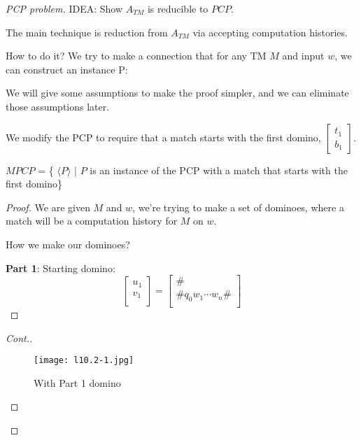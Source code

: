 \begin{proof}[PCP problem]
    IDEA: Show \(A_{TM}\) is reducible to \(PCP\).  

    The main technique is reduction from \(A_{TM}\) via accepting computation histories. 

    How to do it? We try to make a connection that for any TM \(M\) and input \(w\), we can construct an instance P:


    We will give some assumptions to make the proof simpler, and we can eliminate those assumptions later.

    \begin{problem}
        We modify the PCP to require that a match starts with the first domino, \(\begin{bmatrix}
                t_1 \\
                b_1 
        \end{bmatrix} \). 


        \(MPCP\) = \{ \(\langle P \rangle \) | \(P\) is an instance of the PCP with a match that starts with the first domino\} 
    \end{problem}
    \begin{proof}
        We are given \(M\) and \(w\), we're trying to make a set of dominoes, where a match will be a computation history for \(M\) on \(w\).    

        How we make our dominoes?

        \textbf{Part 1}: Starting domino:
        \[
            \begin{bmatrix}
                 u_1 \\
                 v_1 \\
            \end{bmatrix}
            = 
            \begin{bmatrix}
                 \# \\
                 \#q_0w_1\cdots w_n\# \\
            \end{bmatrix}
        \] 
    \end{proof}
    \begin{proof}[Cont.]
        \begin{figure}[H]
            \centering
            \texttt{[image: l10.2-1.jpg]}
            \caption{With Part 1 domino}
        \end{figure}



\end{proof}
\end{proof}
